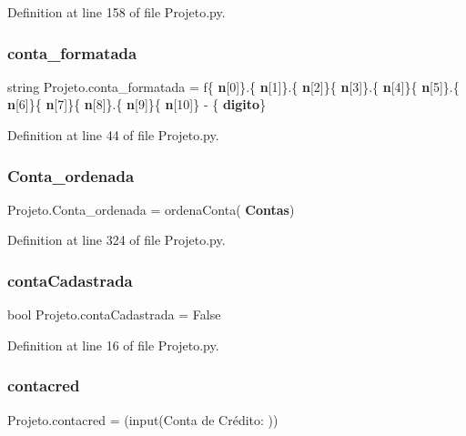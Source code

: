 Definition at line 158 of file Projeto.\+py.

\mbox{\label{namespace_projeto_abb46de849984416459294712fd010bfd}} 
\subsubsection{conta\_formatada}
{\footnotesize\ttfamily string Projeto.\+conta\+\_\+formatada = f\textquotesingle{}\{\textbf{ n}[0]\}.\{\textbf{ n}[1]\}.\{\textbf{ n}[2]\}\{\textbf{ n}[3]\}.\{\textbf{ n}[4]\}\{\textbf{ n}[5]\}.\{\textbf{ n}[6]\}\{\textbf{ n}[7]\}\{\textbf{ n}[8]\}.\{\textbf{ n}[9]\}\{\textbf{ n}[10]\} -\/ \{\textbf{ digito}\}\textquotesingle{}}



Definition at line 44 of file Projeto.\+py.

\mbox{\label{namespace_projeto_a14763e7e385d7a55c1567ed6b58d8960}} 
\subsubsection{Conta\_ordenada}
{\footnotesize\ttfamily Projeto.\+Conta\+\_\+ordenada = ordena\+Conta(\textbf{ Contas})}



Definition at line 324 of file Projeto.\+py.

\mbox{\label{namespace_projeto_a52bab4fbef776f03e171b013f5f1dce6}} 
\subsubsection{contaCadastrada}
{\footnotesize\ttfamily bool Projeto.\+conta\+Cadastrada = False}



Definition at line 16 of file Projeto.\+py.

\mbox{\label{namespace_projeto_a1854fe94ee22a5c42ee839500173e775}} 
\subsubsection{contacred}
{\footnotesize\ttfamily Projeto.\+contacred = (input(\textquotesingle{}Conta de Crédito\+: \textquotesingle{}))}



